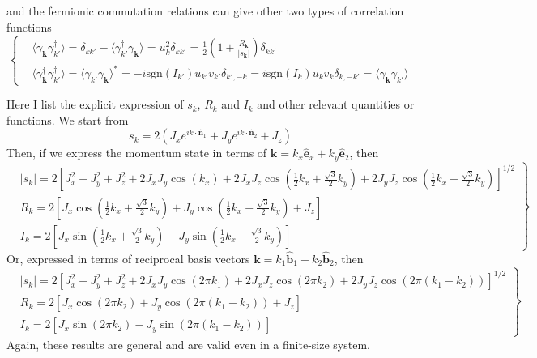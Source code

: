 \documentclass[12font]{article}
\theoremstyle{definition}
\newcommand{\anglelr}[1]{\langle #1 \rangle}
\newcommand{\lr}[1]{\left(  #1  \right)}
\newcommand{\lrm}[1]{\left[  #1  \right]}
\newcommand{\abs}[1]{\left|  #1  \right|}
\newcommand{\mrm}[1]{\mathrm{#1}}
\newcommand{\bo}[1]{\mathbf{#1}}
\begin{document}
and the fermionic commutation relations can give other two types of correlation functions
\[
\left\{
\begin{aligned}
& \anglelr{\gamma_{\bo{k}}\gamma_{k'}^\dagger} = \delta_{kk'} - \anglelr{\gamma^\dagger_{k'}\gamma_{\bo{k}}} = u^2_k\delta_{kk'} = \frac{1}{2}\lr{1+\frac{R_{\bo{k}}}{\abs{s_{\bo{k}}}}}\delta_{kk'} \\
& \anglelr{\gamma_{\bo{k}}^\dagger\gamma_{k'}^\dagger} = \anglelr{\gamma_{k'}\gamma_{\bo{k}}}^* = -i\mrm{sgn}(I_{k'})u_{k'}v_{k'}\delta_{k',-k} = i\mrm{sgn}(I_{k})u_{k}v_{k}\delta_{k,-k'} = \anglelr{\gamma_{\bo{k}}\gamma_{k'}}
\end{aligned}
\right.
\]

Here I list the explicit expression of $s_k$, $R_k$ and $I_k$ and other relevant quantities or functions. We start from 
\[
s_k = 2\lr{J_x e^{ik\cdot \hat{\bo{n}}_1} + J_y e^{ik\cdot \hat{\bo{n}}_2} + J_z}
\]
Then, if we express the momentum state in terms of $\bo{k} = k_x\hat{\bo{e}}_x + k_y\hat{\bo{e}}_2$, then
\begin{equation}\label{eq:functions}
  \left.
  \begin{aligned}
  &\abs{s_k} = 2\lrm{J_x^2+J_y^2+J_z^2 + 2J_xJ_y\cos\lr{k_x} + 2J_xJ_z\cos\lr{\frac{1}{2}k_x+\frac{\sqrt{3}}{2}k_y} + 2J_yJ_z\cos\lr{\frac{1}{2}k_x-\frac{\sqrt{3}}{2}k_y}}^{1/2} \\
  & R_k = 2\lrm{J_x\cos\lr{\frac{1}{2}k_x+\frac{\sqrt{3}}{2}k_y} + J_y\cos\lr{\frac{1}{2}k_x-\frac{\sqrt{3}}{2}k_y} + J_z}\\
  &I_k = 2\lrm{J_x\sin\lr{\frac{1}{2}k_x+\frac{\sqrt{3}}{2}k_y} - J_y\sin\lr{\frac{1}{2}k_x-\frac{\sqrt{3}}{2}k_y}}
  \end{aligned}
  \right\}
\end{equation}
Or, expressed in terms of reciprocal basis vectors $\bo{k} = k_1\hat{\bo{b}}_1 + k_2\hat{\bo{b}}_2$, then
\begin{equation}\label{eq:functions_b}
  \left.
  \begin{aligned}
  &\abs{s_k} 
  = 
  2\lrm{
      J_x^2+J_y^2+J_z^2 + 2J_xJ_y\cos\lr{2\pi k_1} 
      + 
      2J_xJ_z\cos\lr{2\pi k_2} 
      + 
      2J_yJ_z\cos\lr{2\pi (k_1 - k_2)}
  }^{1/2} \\
  & R_k 
  = 2\lrm{
      J_x\cos\lr{2\pi k_2} 
      + 
      J_y\cos\lr{2\pi (k_1 - k_2)} 
      + 
      J_z
  }\\
  &I_k 
  = 2\lrm{
      J_x\sin\lr{2\pi k_2} 
      - 
      J_y\sin\lr{2\pi (k_1 - k_2)}
  }
  \end{aligned}
  \right\}
\end{equation}
Again, these results are general and are valid even in a finite-size system.
\end{document}
